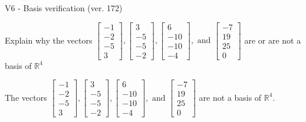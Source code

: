 \begin{exercise}
  \begin{exerciseTitle}V6 - Basis verification (ver. 172)\end{exerciseTitle}
  \begin{exerciseStatement}
    Explain why the vectors \(\left[\begin{array}{r}
-1 \\
-2 \\
-5 \\
3
\end{array}\right] , \left[\begin{array}{r}
3 \\
-5 \\
-5 \\
-2
\end{array}\right] , \left[\begin{array}{r}
6 \\
-10 \\
-10 \\
-4
\end{array}\right] , \text{ and } \left[\begin{array}{r}
-7 \\
19 \\
25 \\
0
\end{array}\right]\) are or are not a basis of \(\mathbb{R}^4\)	


  \end{exerciseStatement}
  \begin{exerciseAnswer}
   The vectors \(\left[\begin{array}{r}
-1 \\
-2 \\
-5 \\
3
\end{array}\right] , \left[\begin{array}{r}
3 \\
-5 \\
-5 \\
-2
\end{array}\right] , \left[\begin{array}{r}
6 \\
-10 \\
-10 \\
-4
\end{array}\right] , \text{ and } \left[\begin{array}{r}
-7 \\
19 \\
25 \\
0
\end{array}\right]\) 
  	 are not  a basis of \(\mathbb{R}^4\).
  


  \end{exerciseAnswer}
\end{exercise}